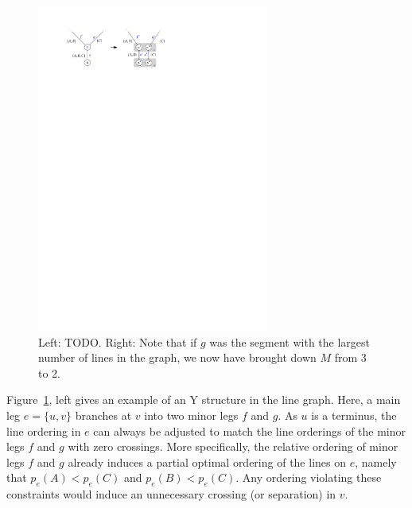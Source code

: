 \documentclass[format=acmsmall, review=false, screen=true]{acmart}
\begin{document}
\begin{figure}
  \centering
  \includegraphics[width=0.68\textwidth]{untangling/y.pdf}
  \caption{Left: TODO. Right: Note that if $g$ was the segment with the largest number of lines in the graph, we now have brought down $M$ from 3 to 2.}  
  \label{FIG:untangle_y}
\end{figure}

Figure~\ref{FIG:untangle_y}, left gives an example of an Y structure in the line graph. Here, a main leg $e = \{u, v\}$ branches at $v$ into two minor legs $f$ and $g$. As $u$ is a terminus, the line ordering in $e$ can always be adjusted to match the line orderings of the minor legs $f$ and $g$ with zero crossings. More specifically, the relative ordering of minor legs $f$ and $g$ already induces a partial optimal ordering of the lines on $e$, namely that $p_e(A) < p_e(C)$ and $p_e(B) < p_e(C)$. Any ordering violating these constraints would induce an unnecessary crossing (or separation) in $v$.
\end{document}
